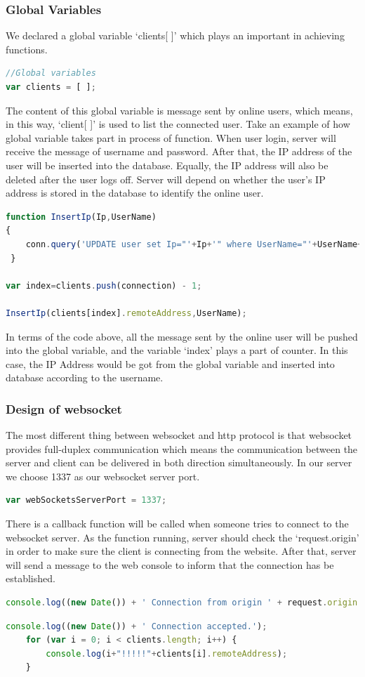 \documentclass[a4paper,11pt]{article}
\begin{document}
\subsubsection{Global Variables}
We declared a global variable ‘clients[ ]’ which plays an important in achieving functions. 
\begin{lstlisting}[language=javascript]
//Global variables
var clients = [ ];
\end{lstlisting}
The content of this global variable is message sent by online users, which means, in this way, ‘client[ ]’ is used to list the connected user. Take an example of how global variable takes part in process of function. When user login, server will receive the message of username and password. After that, the IP address of the user will be inserted into the database. Equally, the IP address will also be deleted after the user logs off. Server will depend on whether the user’s IP address is stored in the database to identify the online user.  
\begin{lstlisting}[language=javascript]
function InsertIp(Ip,UserName)
{
    conn.query('UPDATE user set Ip="'+Ip+'" where UserName="'+UserName+'"',
 }
 
var index=clients.push(connection) - 1;

InsertIp(clients[index].remoteAddress,UserName);
\end{lstlisting}
In terms of the code above, all the message sent by the online user will be pushed into the global variable, and the variable ‘index’ plays a part of counter. In this case, the IP Address would be got from the global variable and inserted into database according to the username.
\subsubsection{Design of websocket}
The most different thing between websocket and http protocol is that websocket provides full-duplex communication which means the communication between the server and client can be delivered in both direction simultaneously. In our server we choose 1337 as our websocket server port.
\begin{lstlisting}[language=javascript]
var webSocketsServerPort = 1337;
\end{lstlisting}
There is a callback function will be called when someone tries to connect to the websocket server. As the function running, server should check the ‘request.origin’ in order to make sure the client is connecting from the website. After that, server will send a message to the web console to inform that the connection has be established.
\begin{lstlisting}[language=javascript]
  console.log((new Date()) + ' Connection from origin ' + request.origin + '.');
\end{lstlisting}
\begin{lstlisting}[language=javascript]
  console.log((new Date()) + ' Connection accepted.');
    for (var i = 0; i < clients.length; i++) {
        console.log(i+"!!!!!"+clients[i].remoteAddress);
    }
\end{lstlisting}
\end{document}
